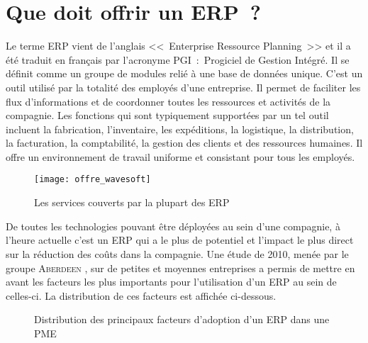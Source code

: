 \section{Que doit offrir un ERP~?}

Le terme ERP vient de l’anglais <<~Enterprise Ressource Planning~>> et il a été traduit en français par l’acronyme PGI~:~Progiciel de Gestion Intégré.
Il se définit comme un groupe de modules relié à une base de données unique.
C'est un outil utilisé par la totalité des employés d'une entreprise.
Il permet de faciliter les flux d'informations et de coordonner toutes les ressources et activités de la compagnie.
Les fonctions qui sont typiquement supportées par un tel outil incluent la fabrication, l'inventaire, les expéditions, la logistique, la distribution, la facturation, la comptabilité, la gestion des clients et des ressources humaines.
Il offre un environnement de travail uniforme et consistant pour tous les employés.

\FloatBarrier
\begin{figure}[h!]
    \begin{center}
        \texttt{[image: offre\_wavesoft]}
    \end{center}
    \caption{Les services couverts par la plupart des ERP}
    \label{figure:erp}
\end{figure}
\FloatBarrier

De toutes les technologies pouvant être déployées au sein d'une compagnie, à l'heure actuelle c'est un ERP qui a le plus de potentiel et l'impact le plus direct sur la réduction des coûts dans la compagnie.
Une étude de 2010, menée par le groupe \textsc{Aberdeen} \cite{erp_sme}, sur de petites et moyennes entreprises a permis de mettre en avant les facteurs les plus importants pour l'utilisation d'un ERP au sein de celles-ci.
La distribution de ces facteurs est affichée ci-dessous. 

\FloatBarrier
\begin{figure}[h!]
    \begin{center}
        \begin{bchart}[steps={10,20,30,40,50},max=50]
            \bcskip{5pt}
            \bcskip{5pt}
            \bcskip{5pt}
            \bcskip{5pt}
            \bcskip{5pt}
             \bcskip{5pt}
        \end{bchart}
    \end{center}
    \caption{Distribution des principaux facteurs d'adoption d'un ERP dans une PME}
    \label{figure:erp_bar}
\end{figure}
\FloatBarrier

